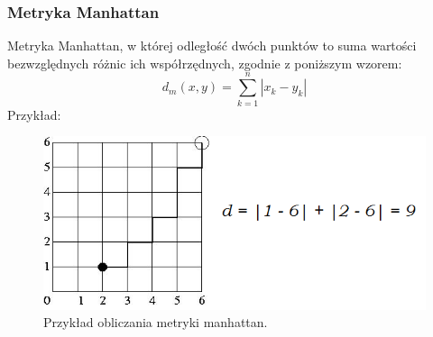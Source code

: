 \documentclass[11pt, a4paper, titlepage]{report}
\begin{document}
\subsubsection{Metryka Manhattan}
\label{subs:Metryka Manhattan}
Metryka Manhattan, w której odległość dwóch punktów to suma wartości bezwzględnych różnic ich współrzędnych, zgodnie z poniższym wzorem:
$$d_m(x,y) = \sum\limits_{k=1}^n |x_k - y_k|$$
Przykład:
\begin{figure}[h]
  \centering
  \includegraphics[scale=0.5]{obrazki/manhattan}
  \caption{Przykład obliczania metryki manhattan.}
\end{figure}
\end{document}

